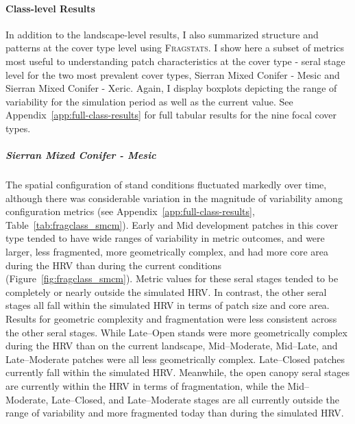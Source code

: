 



\clearpage


\paragraph*{Class-level Results}

In addition to the landscape-level results, I also summarized structure and patterns at the cover type level using \textsc{Fragstats}. I show here a subset of metrics most useful to understanding patch characteristics at the cover type - seral stage level for the two most prevalent cover types, Sierran Mixed Conifer - Mesic and Sierran Mixed Conifer - Xeric. Again, I display boxplots depicting the range of variability for the simulation period as well as the current value. See Appendix~\ref{app:full-class-results} for full tabular results for the nine focal cover types.


\subparagraph*{Sierran Mixed Conifer - Mesic} %
The spatial configuration of stand conditions fluctuated markedly over time, although there was considerable variation in the magnitude of variability among configuration metrics (see Appendix~\ref{app:full-class-results}, Table~\ref{tab:fragclass_smcm}). Early and Mid development patches in this cover type tended to have wide ranges of variability in metric outcomes, and were larger, less fragmented, more geometrically complex, and had more core area during the HRV than during the current conditions (Figure~\ref{fig:fragclass_smcm}). Metric values for these seral stages tended to be completely or nearly outside the simulated HRV. 
In contrast, the other seral stages all fall within the simulated HRV in terms of patch size and core area. Results for geometric complexity and fragmentation were less consistent across the other seral stages. While Late--Open stands were more geometrically complex during the HRV than on the current landscape, Mid--Moderate, Mid--Late, and Late--Moderate patches were all less geometrically complex. Late--Closed patches currently fall within the simulated HRV. Meanwhile, the open canopy seral stages are currently within the HRV in terms of fragmentation, while the Mid--Moderate, Late--Closed, and Late--Moderate stages are all currently outside the range of variability and more fragmented today than during the simulated HRV.  

